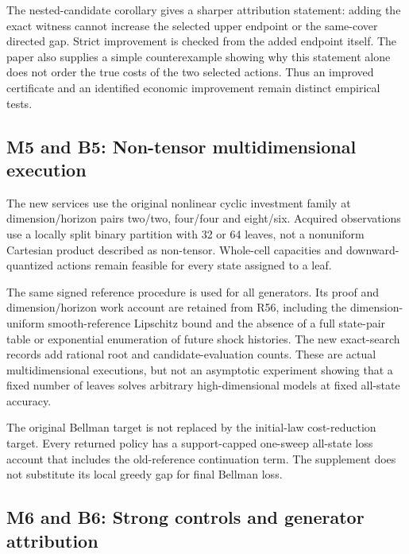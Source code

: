 \documentclass[ecta,nameyear,draft]{econsocart}
\begin{document}
The nested-candidate corollary gives a sharper attribution statement:
adding the exact witness cannot increase the selected upper endpoint or
the same-cover directed gap. Strict improvement is checked from the
added endpoint itself. The paper also supplies a simple counterexample
showing why this statement alone does not order the true costs of the
two selected actions. Thus an improved certificate and an identified
economic improvement remain distinct empirical tests.

\hypertarget{m5-and-b5-non-tensor-multidimensional-execution}{%
\subsection{M5 and B5: Non-tensor multidimensional
execution}\label{m5-and-b5-non-tensor-multidimensional-execution}}

The new services use the original nonlinear cyclic investment family at
dimension/horizon pairs two/two, four/four and eight/six. Acquired
observations use a locally split binary partition with 32 or 64 leaves,
not a nonuniform Cartesian product described as non-tensor. Whole-cell
capacities and downward-quantized actions remain feasible for every
state assigned to a leaf.

The same signed reference procedure is used for all generators. Its
proof and dimension/horizon work account are retained from R56,
including the dimension-uniform smooth-reference Lipschitz bound and the
absence of a full state-pair table or exponential enumeration of future
shock histories. The new exact-search records add rational root and
candidate-evaluation counts. These are actual multidimensional
executions, but not an asymptotic experiment showing that a fixed number
of leaves solves arbitrary high-dimensional models at fixed all-state
accuracy.

The original Bellman target is not replaced by the initial-law
cost-reduction target. Every returned policy has a support-capped
one-sweep all-state loss account that includes the old-reference
continuation term. The supplement does not substitute its local greedy
gap for final Bellman loss.

\hypertarget{m6-and-b6-strong-controls-and-generator-attribution}{%
\subsection{M6 and B6: Strong controls and generator
attribution}\label{m6-and-b6-strong-controls-and-generator-attribution}}
\end{document}

